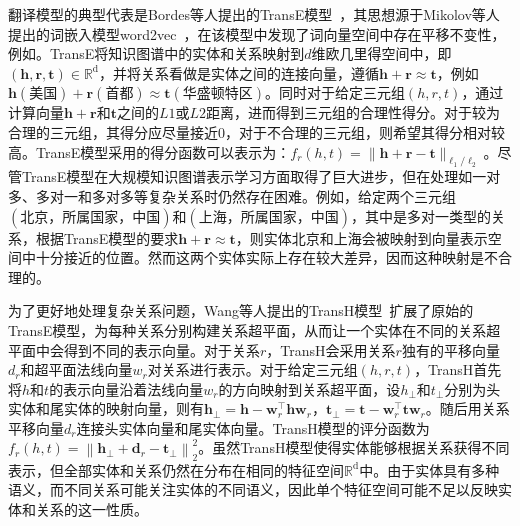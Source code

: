 \documentclass[algorithmlist, AutoFakeBold, AutoFakeSlant, figurelist, tablelist, nomlist, masters]{seuthesix}
\begin{document}
翻译模型的典型代表是Bordes等人提出的TransE模型~\cite{bordes2013translating}，其思想源于Mikolov等人提出的词嵌入模型word2vec~\cite{toms2013}，在该模型中发现了词向量空间中存在平移不变性，例如。TransE将知识图谱中的实体和关系映射到$d$维欧几里得空间中，即$\left(\bm{h}, \bm{r}, \bm{t}\right) \in \mathbb{R}^{\mathrm{d}}$，并将关系看做是实体之间的连接向量，遵循$\bm{h} + \bm{r} \approx \bm{t}$，例如$\bm{h}\left(\mbox{美国}\right) + \bm{r}\left(\mbox{首都}\right) \approx \bm{t}\left(\mbox{华盛顿特区}\right)$。同时对于给定三元组$\left(h, r, t\right)$，通过计算向量$\bm{h} + \bm{r}$和$\bm{t}$之间的$L1$或$L2$距离，进而得到三元组的合理性得分。对于较为合理的三元组，其得分应尽量接近0，对于不合理的三元组，则希望其得分相对较高。TransE模型采用的得分函数可以表示为：$f_r(h, t) = \|\bm{h} + \bm{r} - \bm{t}\|_{\ell_1 / \ell_2}$。尽管TransE模型在大规模知识图谱表示学习方面取得了巨大进步，但在处理如一对多、多对一和多对多等复杂关系时仍然存在困难。例如，给定两个三元组$\left(\mbox{北京，所属国家，中国}\right)$和$\left(\mbox{上海，所属国家，中国}\right)$，其中是多对一类型的关系，根据TransE模型的要求$\bm{h} + \bm{r} \approx \bm{t}$，则实体$\mbox{北京}$和$\mbox{上海}$会被映射到向量表示空间中十分接近的位置。然而这两个实体实际上存在较大差异，因而这种映射是不合理的。

为了更好地处理复杂关系问题，Wang等人提出的TransH模型~\cite{wang2014knowledge}扩展了原始的TransE模型，为每种关系分别构建关系超平面，从而让一个实体在不同的关系超平面中会得到不同的表示向量。对于关系$r$，TransH会采用关系$r$独有的平移向量$d_r$和超平面法线向量$w_r$对关系进行表示。对于给定三元组$\left(h, r, t\right)$，TransH首先将$h$和$t$的表示向量沿着法线向量$w_r$的方向映射到关系超平面，设$h_\perp$和$t_\perp$分别为头实体和尾实体的映射向量，则有$\bm{h}_{\perp} = \bm{h} - \bm{w}_r^{\top} \bm{h} \bm{w}_r$，$\bm{t}_{\perp} = \bm{t} - \bm{w}_r^{\top} \bm{t} \bm{w}_r$。随后用关系平移向量$d_r$连接头实体向量和尾实体向量。TransH模型的评分函数为$f_r(h, t) = \left\|\bm{h}_{\perp} + \bm{d}_r - \boldsymbol{t}_{\perp}\right\|_2^2$。虽然TransH模型使得实体能够根据关系获得不同表示，但全部实体和关系仍然在分布在相同的特征空间$\mathbb{R}^{\mathrm{d}}$中。由于实体具有多种语义，而不同关系可能关注实体的不同语义，因此单个特征空间可能不足以反映实体和关系的这一性质。
\end{document}
